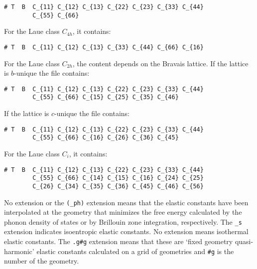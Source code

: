 \documentclass[12pt,a4paper,twoside]{report}
\begin{document}
\begin{itemize}
\begin{verbatim}
# T  B  C_{11} C_{12} C_{13} C_{22} C_{23} C_{33} C_{44} 
        C_{55} C_{66}
\end{verbatim}
For the Laue class $C_{4h}$, it contains:
\begin{verbatim}
# T  B  C_{11} C_{12} C_{13} C_{33} C_{44} C_{66} C_{16}  
\end{verbatim}
For the Laue class $C_{2h}$, the content depends on the Bravais lattice. 
If the lattice is $b$-unique the file contains:
\begin{verbatim}
# T  B  C_{11} C_{12} C_{13} C_{22} C_{23} C_{33} C_{44} 
        C_{55} C_{66} C_{15} C_{25} C_{35} C_{46} 
\end{verbatim}
If the lattice is $c$-unique the file contains:
\begin{verbatim}
# T  B  C_{11} C_{12} C_{13} C_{22} C_{23} C_{33} C_{44} 
        C_{55} C_{66} C_{16} C_{26} C_{36} C_{45} 
\end{verbatim}
For the Laue class $C_i$, it contains:
\begin{verbatim}
# T  B  C_{11} C_{12} C_{13} C_{22} C_{23} C_{33} C_{44} 
        C_{55} C_{66} C_{14} C_{15} C_{16} C_{24} C_{25} 
        C_{26} C_{34} C_{35} C_{36} C_{45} C_{46} C_{56} 
\end{verbatim}
No extension or the \texttt{(\_ph)} extension means that the elastic
constants have been interpolated at the geometry that minimizes the
free energy calculated by the phonon density of states or by Brillouin
zone integration, respectively. 
The \texttt{\_s} extension indicates isoentropic elastic constants.
No extension means isothermal elastic constants.
The \texttt{.g\#g} extension means that these are `fixed geometry
quasi-harmonic' elastic constants calculated on a grid of geometries
and \texttt{\#g} is the number of the geometry.


\end{itemize}
\end{document}
